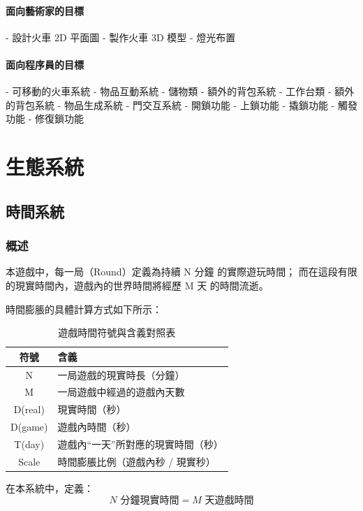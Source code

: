 \paragraph{\Large\bfseries 面向藝術家的目標}
\begin{markdown}
- 設計火車 2D 平面圖
- 製作火車 3D 模型
- 燈光布置
\end{markdown}
\paragraph{\Large\bfseries 面向程序員的目標}
\begin{markdown}
- 可移動的火車系統
- 物品互動系統
    - 儲物類
      - 額外的背包系統
    - 工作台類
      - 額外的背包系統
      - 物品生成系統
- 門交互系統
    - 開鎖功能
    - 上鎖功能
    - 撬鎖功能
    - 觸發功能
    - 修復鎖功能
\end{markdown}

\section{生態系統}
\subsection{時間系統}
\subsubsection{概述}
本遊戲中，每一局（Round）定義為持續 N 分鐘 的實際遊玩時間；
而在這段有限的現實時間內，遊戲內的世界時間將經歷 M 天 的時間流逝。

時間膨脹的具體計算方式如下所示：
\begin{table}[h!]
\centering
\caption{遊戲時間符號與含義對照表}
\begin{tabular}{|c|l|}
\hline
\textbf{符號} & \textbf{含義} \\ \hline
N & 一局遊戲的現實時長（分鐘） \\ \hline
M & 一局遊戲中經過的遊戲內天數 \\ \hline
D(real) & 現實時間（秒） \\ \hline
D(game) & 遊戲內時間（秒） \\ \hline
T(day) & 遊戲內“一天”所對應的現實時間（秒） \\ \hline
Scale & 時間膨脹比例（遊戲內秒 / 現實秒） \\ \hline
\end{tabular}
\end{table}
在本系統中，定義：
\[
N \text{ 分鐘現實時間} = M \text{ 天遊戲時間}
\]

